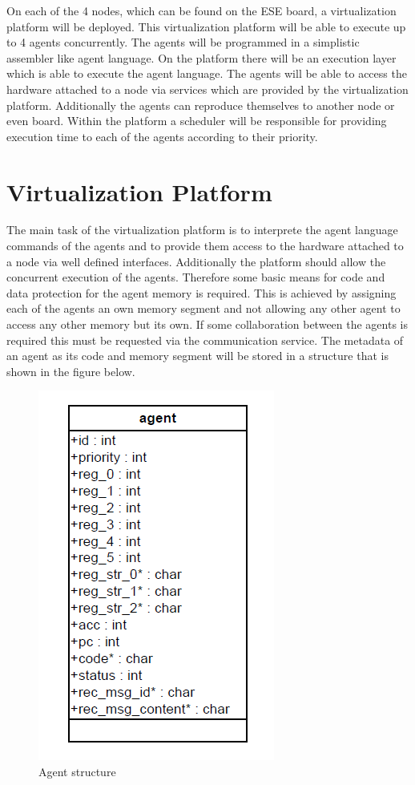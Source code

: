 \documentclass{scrreprt}
\begin{document}
On each of the 4 nodes, which can be found on the ESE board, a virtualization platform will be deployed. 
This virtualization platform will be able to execute up to 4 agents concurrently. The agents will be 
programmed in a simplistic assembler like agent language. On the platform there will be an execution 
layer which is able to execute the agent language. The agents will be able to access the hardware attached
to a node via services which are provided by the virtualization platform. Additionally the agents can
reproduce themselves to another node or even board. Within the platform a scheduler will be responsible for
providing execution time to each of the agents according to their priority. 

\section{Virtualization Platform}
The main task of the virtualization platform is to interprete the agent language commands of the agents 
and to provide them access to the hardware attached to a node via well defined interfaces. Additionally 
the platform should allow the concurrent execution of the agents. Therefore some basic means for code and 
data protection for the agent memory is required. This is achieved by assigning each of the agents an own 
memory segment and not allowing any other agent to access any other memory but its own. If some collaboration 
between the agents is required this must be requested via the communication service. The metadata of an agent 
as its code and memory segment will be stored in a structure that is shown in the figure below. 


\begin{figure}[!htbp]
\begin{center}
\includegraphics[scale=0.4]{figures/agent.png}
\caption{Agent structure}
\end{center}
\label{agent}
\end{figure}
\end{document}
